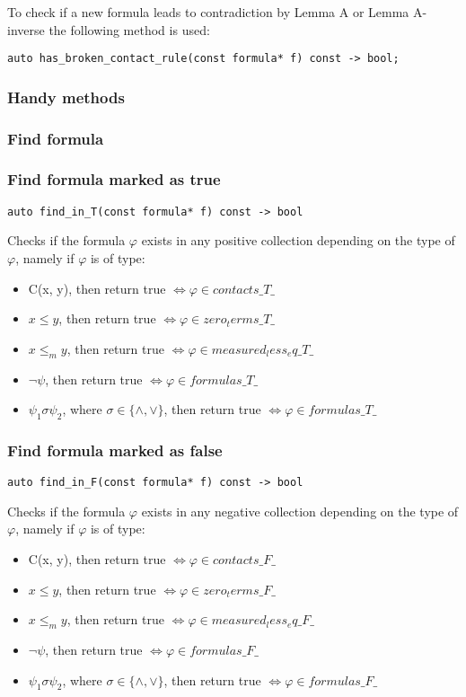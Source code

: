 \documentclass{article}
\begin{document}
				To check if a new formula leads to contradiction by Lemma A or Lemma A-inverse the following method is used:
				\begin{lstlisting}
auto has_broken_contact_rule(const formula* f) const -> bool;
				\end{lstlisting}

			\subsubsection{Handy methods}
			\subsubsection*{Find formula}
			\subsubsection*{Find formula marked as true}
				\begin{lstlisting}
auto find_in_T(const formula* f) const -> bool
				\end{lstlisting}
				Checks if the formula $\varphi$ exists in any positive collection depending on the type of $\varphi$, namely
				if $\varphi$ is of type:
				\begin{itemize}
					\item C(x, y), then return true $\iff \varphi \in contacts\_T\_$
					\item $x \le y$, then return true $\iff \varphi \in zero_terms\_T\_$
					\item $x \le_m y$, then return true $\iff \varphi \in measured_less_eq\_T\_$
					\item $\neg \psi$, then return true $\iff \varphi \in formulas\_T\_$
					\item $\psi_1 \sigma \psi_2$, where $\sigma \in \{\wedge, \vee\}$, then return true $\iff \varphi \in formulas\_T\_$
				\end{itemize}
			\subsubsection*{Find formula marked as false}
				\begin{lstlisting}
auto find_in_F(const formula* f) const -> bool
				\end{lstlisting}
				Checks if the formula $\varphi$ exists in any negative collection depending on the type of $\varphi$, namely
				if $\varphi$ is of type:
				\begin{itemize}
					\item C(x, y), then return true $\iff \varphi \in contacts\_F\_$
					\item $x \le y$, then return true $\iff \varphi \in zero_terms\_F\_$
					\item $x \le_m y$, then return true $\iff \varphi \in measured_less_eq\_F\_$
					\item $\neg \psi$, then return true $\iff \varphi \in formulas\_F\_$
					\item $\psi_1 \sigma \psi_2$, where $\sigma \in \{\wedge, \vee\}$, then return true $\iff \varphi \in formulas\_F\_$
				\end{itemize}
\end{document}
